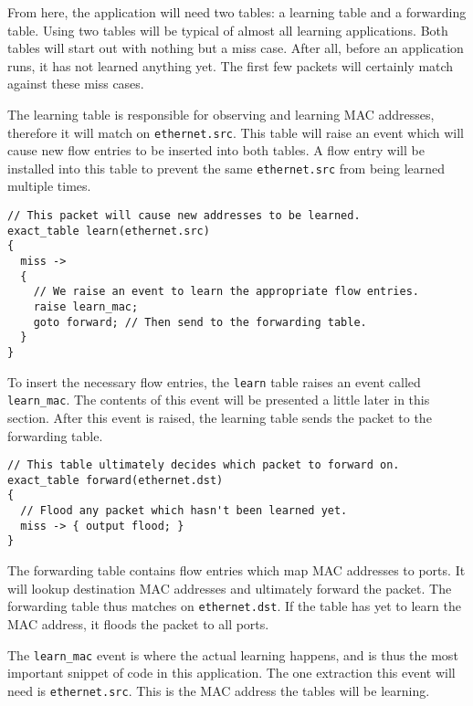 From here, the application will need two tables: a learning table and a forwarding table.
Using two tables will be typical of almost all learning applications. Both
tables will start out with nothing but a miss case. After all, before an
application runs, it has not learned anything yet. The first few packets will
certainly match against these miss cases.

The learning table is responsible for observing and learning MAC addresses, therefore it will match on \texttt{ethernet.src}. This table will raise an event which will
cause new flow entries to be inserted into both tables.  A flow entry will be installed into this
table to prevent the same \texttt{ethernet.src} from being learned multiple
times.

\begin{codepage}
\begin{lstlisting}
// This packet will cause new addresses to be learned.
exact_table learn(ethernet.src)
{
  miss ->
  {
  	// We raise an event to learn the appropriate flow entries.
  	raise learn_mac;
    goto forward; // Then send to the forwarding table.
  }
}
\end{lstlisting}
\end{codepage}

To insert the necessary flow entries, the \texttt{learn} table raises an event
called \texttt{learn\_mac}. The contents of this event will be presented a little later in this section.
After this event is raised, the learning table sends the packet to the
forwarding table.

\begin{codepage}
\begin{lstlisting}
// This table ultimately decides which packet to forward on.
exact_table forward(ethernet.dst)
{
  // Flood any packet which hasn't been learned yet.
  miss -> { output flood; }
}
\end{lstlisting}
\end{codepage}

The forwarding table contains flow entries which map MAC addresses to ports. It will lookup destination MAC addresses and ultimately forward the packet. The forwarding table thus
matches on \texttt{ethernet.dst}. If the table has yet to learn the MAC address, it floods the packet to all ports.


The \texttt{learn\_mac} event is where the actual
learning happens, and is thus the most important snippet of code in this
application. The one extraction this event will need is \texttt{ethernet.src}.
This is the MAC address the tables will be learning.

